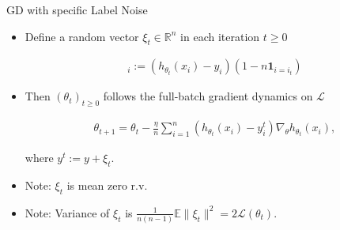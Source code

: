 \documentclass[fleqn]{beamer}
\begin{document}
    \begin{frame}{GD with specific Label Noise}
        \begin{itemize}[<+->]
            \item Define a random vector $\xi_t \in \mathbb{R}^{n}$ in each iteration
                $t \ge 0$
                \begin{center}
                \begin{minipage}{0.5\textwidth}
                    \begin{align*}
                        [\xi_t]_i := (h_{\theta_t}(x_i) -
                        y_i)(1-n\mathbf{1}_{i=i_t})
                    \end{align*}
                \end{minipage}
                \end{center}
                \vspace{0.5cm}
            \item Then $(\theta_t)_{t\ge0}$ follows the full-batch gradient
                dynamics on $\mathcal{L}$
                \begin{center}
                \begin{minipage}{0.5\textwidth}
                \begin{align*}
                    \theta_{t+1} = \theta_t - \frac{\eta}{n} \sum_{i=1}^{n}
                    \left( h_{\theta_t}(x_i) - y_i^{t} \right)
                    \nabla_{\theta} h_{\theta_t}(x_i),
                \end{align*}
                \end{minipage}
                \end{center}
                where $y^{t}:= y + \xi_t$.
            \item Note: $\xi_t$ is mean zero r.v.
            \item Note: Variance of $\xi_t$ is
                $\frac{1}{n(n-1)}\mathbb{E}\|\xi_t\|^{2} = 2
                \mathcal{L}(\theta_t)$.
        \end{itemize}
    \end{frame}
\end{document}
